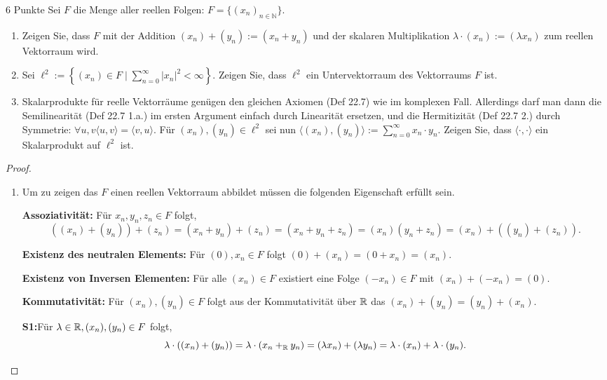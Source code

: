 \documentclass{problemset}
\begin{document}
\begin{problem}{6 Punkte}
Sei $F$ die Menge aller reellen Folgen: $F = \{(x_n)_{n\in\mathbb{N}}\}$.
\begin{enumerate}
    \item Zeigen Sie, dass $F$ mit der Addition $(x_n) + (y_n) := (x_n + y_n)$
          und der skalaren Multiplikation $\lambda \cdot (x_n) := (\lambda
          x_n)$ zum reellen Vektorraum wird.
    \item Sei $\ell^2 := \left\{(x_n) \in F \mid \sum_{n=0}^{\infty} |x_n|^2 <
          \infty\right\}$. Zeigen Sie, dass $\ell^2$ ein Untervektorraum des
          Vektorraums $F$ ist.
    \item Skalarprodukte für reelle Vektorräume genügen den gleichen Axiomen
          (Def 22.7) wie im komplexen Fall. Allerdings darf man dann die
          Semilinearität (Def 22.7 1.a.) im ersten Argument einfach durch
          Linearität ersetzen, und die Hermitizität (Def 22.7 2.) durch
          Symmetrie: $\forall u, v \langle u, v \rangle = \langle v, u
          \rangle$. Für $(x_n), (y_n) \in \ell^2$ sei nun $\langle (x_n), (y_n)
          \rangle := \sum_{n=0}^{\infty} x_n \cdot y_n$. Zeigen Sie, dass
          $\langle \cdot, \cdot \rangle$ ein Skalarprodukt auf $\ell^2$ ist.
\end{enumerate}

\begin{proof}
    \leavevmode
    \begin{enumerate}
        \item Um zu zeigen das \(F\) einen reellen Vektorraum abbildet müssen
              die folgenden Eigenschaft erfüllt sein.

              \textbf{Assoziativität:} Für \(x_n,y_n,z_n
              \in F\) folgt, \[
                  ((x_n) + (y_n)) + (z_n) = (x_n + y_n) + (z_n) = (x_n + y_n + z_n) = (x_n) (y_n + z_n) = (x_n) + ((y_n) + (z_n)).
              \]

              \textbf{Existenz des neutralen Elements:} Für \((0), x_n \in F\) folgt \((0) + (x_n) = (0 + x_n) = (x_n)\).

              \textbf{Existenz von Inversen Elementen:} Für alle \((x_n) \in F\) existiert eine Folge \((-x_n) \in F\) mit \((x_n) + (-x_n) = (0)\).

              \textbf{Kommutativität:} Für \((x_n), (y_n) \in F\) folgt aus der Kommutativität über \(\mathbb{R}\) das \((x_n) + (y_n) = (y_n) + (x_n)\).

              \textbf{S1:}Für \(\lambda \in \mathbb{R}, (x_n), (y_n) \in F\) folgt, \[
                  \lambda \cdot ((x_n) + (y_n)) = \lambda \cdot (x_n +_{\mathbb{R}} y_n) = (\lambda x_n) + (\lambda y_n) = \lambda \cdot (x_n) + \lambda \cdot (y_n).
              \]


\end{enumerate}
\end{proof}
\end{problem}
\end{document}
